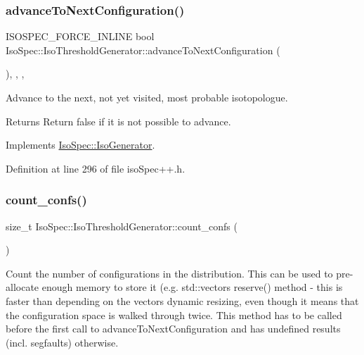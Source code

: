 \subsubsection{\texorpdfstring{advance\+To\+Next\+Configuration()}{advanceToNextConfiguration()}}
{\footnotesize\ttfamily I\+S\+O\+S\+P\+E\+C\+\_\+\+F\+O\+R\+C\+E\+\_\+\+I\+N\+L\+I\+NE bool Iso\+Spec\+::\+Iso\+Threshold\+Generator\+::advance\+To\+Next\+Configuration (\begin{DoxyParamCaption}{ }\end{DoxyParamCaption})\hspace{0.3cm}{\ttfamily [inline]}, {\ttfamily [final]}, {\ttfamily [override]}, {\ttfamily [virtual]}}



Advance to the next, not yet visited, most probable isotopologue. 

\begin{DoxyReturn}{Returns}
Return false if it is not possible to advance. 
\end{DoxyReturn}


Implements \mbox{\hyperlink{class_iso_spec_1_1_iso_generator_a20f48ba18c6aecc57d73b2c3ec3a11dd}{Iso\+Spec\+::\+Iso\+Generator}}.



Definition at line 296 of file iso\+Spec++.\+h.

\mbox{\label{class_iso_spec_1_1_iso_threshold_generator_ad29d8761174bca7b1846ddec03b33528}} 
\subsubsection{\texorpdfstring{count\+\_\+confs()}{count\_confs()}}
{\footnotesize\ttfamily size\+\_\+t Iso\+Spec\+::\+Iso\+Threshold\+Generator\+::count\+\_\+confs (\begin{DoxyParamCaption}{ }\end{DoxyParamCaption})}

Count the number of configurations in the distribution. This can be used to pre-\/allocate enough memory to store it (e.\+g. std\+::vector\textquotesingle{}s reserve() method -\/ this is faster than depending on the vector\textquotesingle{}s dynamic resizing, even though it means that the configuration space is walked through twice. This method has to be called before the first call to advance\+To\+Next\+Configuration and has undefined results (incl. segfaults) otherwise. 

